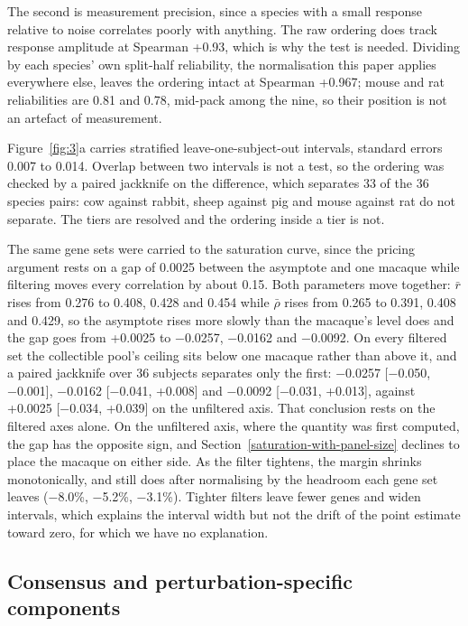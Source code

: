 \documentclass[11pt,a4paper]{article}
\begin{document}
The second is measurement precision, since a species with a small
response relative to noise correlates poorly with anything. The raw
ordering does track response amplitude at Spearman +0.93, which is why
the test is needed. Dividing by each species' own split-half
reliability, the normalisation this paper applies everywhere else,
leaves the ordering intact at Spearman +0.967; mouse and rat
reliabilities are 0.81 and 0.78, mid-pack among the nine, so their
position is not an artefact of measurement.

Figure~\ref{fig:3}a carries stratified leave-one-subject-out intervals, standard
errors 0.007 to 0.014. Overlap between two intervals is not a test, so
the ordering was checked by a paired jackknife on the difference, which
separates 33 of the 36 species pairs: cow against rabbit, sheep against
pig and mouse against rat do not separate. The tiers are resolved and
the ordering inside a tier is not.

The same gene sets were carried to the saturation curve, since the
pricing argument rests on a gap of 0.0025 between the asymptote and one
macaque while filtering moves every correlation by about 0.15. Both
parameters move together: \ensuremath{\bar{r}} rises from 0.276 to 0.408, 0.428 and 0.454
while \ensuremath{\bar{\rho}} rises from 0.265 to 0.391, 0.408 and 0.429, so the asymptote
rises more slowly than the macaque's level does and the gap goes from
+0.0025 to −0.0257, −0.0162 and −0.0092. On every filtered set the
collectible pool's ceiling sits below one macaque rather than above it,
and a paired jackknife over 36 subjects separates only the first:
−0.0257 {[}−0.050, −0.001{]}, −0.0162 {[}−0.041, +0.008{]} and −0.0092
{[}−0.031, +0.013{]}, against +0.0025 {[}−0.034, +0.039{]} on the
unfiltered axis. That conclusion rests on the filtered axes alone. On
the unfiltered axis, where the quantity was first computed, the gap has
the opposite sign, and Section~\ref{saturation-with-panel-size} declines to place the macaque on
either side. As the filter tightens, the margin shrinks monotonically,
and still does after normalising by the headroom each gene set leaves
(−8.0\%, −5.2\%, −3.1\%). Tighter filters leave fewer genes and widen
intervals, which explains the interval width but not the drift of the
point estimate toward zero, for which we have no explanation.

\subsection{Consensus and perturbation-specific
components}\label{consensus-and-perturbation-specific-components}
\end{document}
